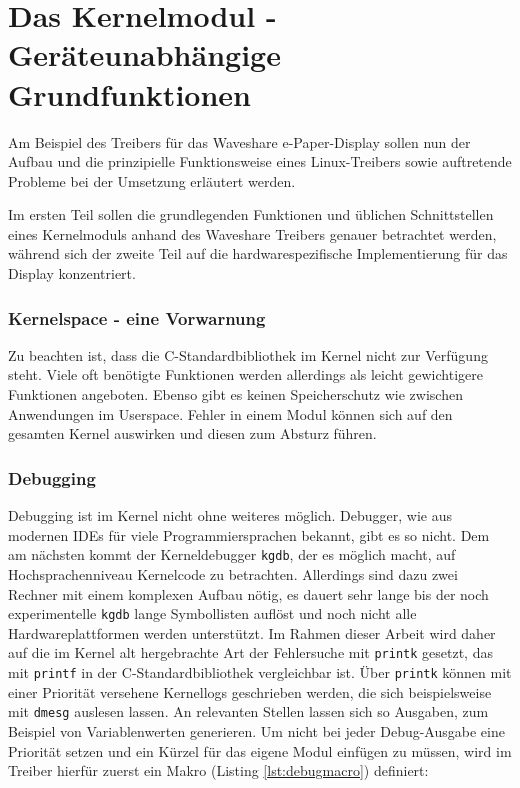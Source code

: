 
\chapter{Das Kernelmodul - Geräteunabhängige Grundfunktionen} 
Am Beispiel des Treibers für das Waveshare e-Paper-Display sollen nun der Aufbau und die prinzipielle Funktionsweise eines Linux-Treibers sowie auftretende Probleme bei der Umsetzung erläutert werden. 

Im ersten Teil sollen die grundlegenden Funktionen und üblichen Schnittstellen eines Kernelmoduls anhand des Waveshare Treibers genauer betrachtet werden, während sich der zweite Teil auf die hardwarespezifische Implementierung für das Display konzentriert.


\subsection{Kernelspace - eine Vorwarnung}
Zu beachten ist, dass die C-Standardbibliothek im Kernel nicht zur Verfügung steht. Viele oft benötigte Funktionen werden allerdings als leicht gewichtigere Funktionen angeboten. Ebenso gibt es keinen Speicherschutz wie zwischen Anwendungen im Userspace. Fehler in einem Modul können sich auf den gesamten Kernel auswirken und diesen zum Absturz führen. 

\subsection{Debugging}
Debugging ist im Kernel nicht ohne weiteres möglich. Debugger, wie aus modernen IDEs für viele Programmiersprachen bekannt, gibt es so nicht. Dem am nächsten kommt der Kerneldebugger \texttt{kgdb}, der es möglich macht, auf Hochsprachenniveau Kernelcode zu betrachten. Allerdings sind dazu zwei Rechner mit einem komplexen Aufbau nötig, es dauert sehr lange bis der noch experimentelle \texttt{kgdb} lange Symbollisten auflöst und noch nicht alle Hardwareplattformen werden unterstützt. %
Im Rahmen dieser Arbeit wird daher auf die im Kernel alt hergebrachte Art der Fehlersuche mit \texttt{printk} gesetzt, das mit \texttt{printf} in der C-Standardbibliothek vergleichbar ist. Über \texttt{printk} können mit einer Priorität versehene Kernellogs geschrieben werden, die sich beispielsweise mit \texttt{dmesg} auslesen lassen. An relevanten Stellen lassen sich so Ausgaben, zum Beispiel von Variablenwerten generieren. Um nicht bei jeder Debug-Ausgabe eine Priorität setzen und ein Kürzel für das eigene Modul einfügen zu müssen, wird im Treiber hierfür zuerst ein Makro (Listing \ref{lst:debugmacro}) definiert:

